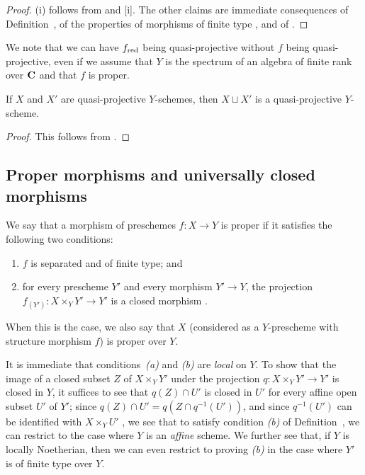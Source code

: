 \begin{proof}
\label{proof-2.5.3.4}
(i) follows from  and [i].
The other claims are immediate consequences of Definition~,  of the properties of morphisms of finite type , and of .
\end{proof}

\begin{rmk}[5.3.5]
\label{2.5.3.5}
We note that we can have $f_{\mathrm{red}}$ being quasi-projective without $f$ being quasi-projective, even if we assume that $Y$ is the spectrum of an algebra of finite rank over $\mathbf{C}$ and that $f$ is proper.
\end{rmk}

\begin{cor}[5.3.6]
\label{2.5.3.6}
If $X$ and $X'$ are quasi-projective $Y$-schemes, then $X\sqcup X'$ is a quasi-projective $Y$-scheme.
\end{cor}

\begin{proof}
\label{proof-2.5.3.6}
This follows from .
\end{proof}

\subsection{Proper morphisms and universally closed morphisms}
\label{subsection:proper-morphisms-and-universally-closed-morphisms}

\begin{defn}[5.4.1]
\label{2.5.4.1}
We say that a morphism of preschemes $f:X\to Y$ is proper if it satisfies the following two conditions:
\begin{enumerate}[label=\emph{(\alph*)}]
    \item $f$ is separated and of finite type; and
    \item for every prescheme $Y'$ and every morphism $Y'\to Y$, the projection $f_{(Y')}:X\times_Y Y'\to Y'$ is a closed morphism .
\end{enumerate}

When this is the case, we also say that $X$ (considered as a $Y$-prescheme with structure morphism $f$) is proper over $Y$.
\end{defn}

It is immediate that conditions~\emph{(a)} and \emph{(b)} are \emph{local} on $Y$.
To show that the image of a closed subset $Z$ of $X\times_Y Y'$ under the projection $q:X\times_Y Y'\to Y'$ is closed in $Y$, it suffices to see that $q(Z)\cap U'$ is closed in $U'$ for every affine open subset $U'$ of $Y'$;
since $q(Z)\cap U'=q(Z\cap q^{-1}(U'))$, and since $q^{-1}(U')$ can be identified with $X\times_Y U'$ , we see that to satisfy condition \emph{(b)} of Definition~, we can restrict to the case where $Y$ is an \emph{affine} scheme.
We further see  that, if $Y$ is locally Noetherian, then we can even restrict to proving \emph{(b)} in the case where $Y'$ is of finite type over $Y$.


